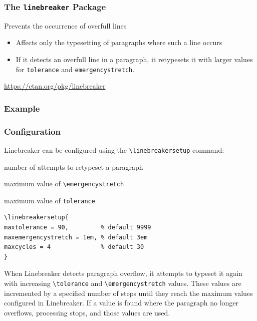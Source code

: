 \begin{frame}[fragile]
  \frametitle{The \texttt{linebreaker} Package}
  Prevents the occurrence of overfull lines
  \begin{itemize}
    \item Affects only the typesetting of paragraphs where such a line occurs
    \item If it detects an overfull line in a paragraph, it retypesets it with larger values for
      \verb|tolerance| and \verb|emergencystretch|.
  \end{itemize}

  \bigskip

  \url{https://ctan.org/pkg/linebreaker}
\end{frame}

\begin{frame}
  \frametitle{Example}
\end{frame}

\begin{frame}[fragile]
  \frametitle{Configuration}
  Linebreaker can be configured using the \verb|\linebreakersetup| command:

  \bigskip

  \begin{description}[maxemergencystretch]
    \item[maxcycles] number of attempts to retypeset a paragraph
    \item[maxemergencystretch] maximum value of \verb|\emergencystretch|
    \item[maxtolerance]  maximum value of \verb|tolerance|
  \end{description}

  \bigskip

\begin{verbatim}
\linebreakersetup{
maxtolerance = 90,         % default 9999
maxemergencystretch = 1em, % default 3em
maxcycles = 4              % default 30
}
\end{verbatim}

\end{frame}

When Linebreaker detects paragraph overflow, it attempts to typeset it again
with increasing \verb|\tolerance| and \verb|\emergencystretch| values. These values are
incremented by a specified number of steps until they reach the maximum values
configured in Linebreaker. If a value is found where the paragraph no longer
overflows, processing stops, and those values are used.

